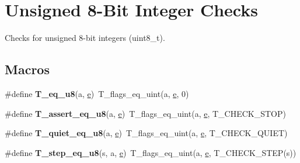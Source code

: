 \hypertarget{group__RTEMSTestFrameworkChecksUInt8}{}\section{Unsigned 8-\/Bit Integer Checks}
\label{group__RTEMSTestFrameworkChecksUInt8}


Checks for unsigned 8-\/bit integers (uint8\+\_\+t).  


\subsection*{Macros}
\begin{DoxyCompactItemize}
\item 
\mbox{\label{group__RTEMSTestFrameworkChecksUInt8_ga96f771cd24581fee6ba364261630c2be}} 
\#define {\bfseries T\+\_\+eq\+\_\+u8}(a,  \mbox{\hyperlink{sun4u_2tte_8h_a8b0b9ed08e0e18920ec2682f48228c27}{e}})~T\+\_\+flags\+\_\+eq\+\_\+uint(a, \mbox{\hyperlink{sun4u_2tte_8h_a8b0b9ed08e0e18920ec2682f48228c27}{e}}, 0)
\item 
\mbox{\label{group__RTEMSTestFrameworkChecksUInt8_ga1aff9f773182564cebc087d181960d14}} 
\#define {\bfseries T\+\_\+assert\+\_\+eq\+\_\+u8}(a,  \mbox{\hyperlink{sun4u_2tte_8h_a8b0b9ed08e0e18920ec2682f48228c27}{e}})~T\+\_\+flags\+\_\+eq\+\_\+uint(a, \mbox{\hyperlink{sun4u_2tte_8h_a8b0b9ed08e0e18920ec2682f48228c27}{e}}, T\+\_\+\+C\+H\+E\+C\+K\+\_\+\+S\+T\+OP)
\item 
\mbox{\label{group__RTEMSTestFrameworkChecksUInt8_ga5ece4304b9c3b30edadd4c64b1c98f2c}} 
\#define {\bfseries T\+\_\+quiet\+\_\+eq\+\_\+u8}(a,  \mbox{\hyperlink{sun4u_2tte_8h_a8b0b9ed08e0e18920ec2682f48228c27}{e}})~T\+\_\+flags\+\_\+eq\+\_\+uint(a, \mbox{\hyperlink{sun4u_2tte_8h_a8b0b9ed08e0e18920ec2682f48228c27}{e}}, T\+\_\+\+C\+H\+E\+C\+K\+\_\+\+Q\+U\+I\+ET)
\item 
\mbox{\label{group__RTEMSTestFrameworkChecksUInt8_gab7c72c1913cbb29e715f427d6aea03e7}} 
\#define {\bfseries T\+\_\+step\+\_\+eq\+\_\+u8}(s,  a,  \mbox{\hyperlink{sun4u_2tte_8h_a8b0b9ed08e0e18920ec2682f48228c27}{e}})~T\+\_\+flags\+\_\+eq\+\_\+uint(a, \mbox{\hyperlink{sun4u_2tte_8h_a8b0b9ed08e0e18920ec2682f48228c27}{e}}, T\+\_\+\+C\+H\+E\+C\+K\+\_\+\+S\+T\+EP(s))

\end{DoxyCompactItemize}
